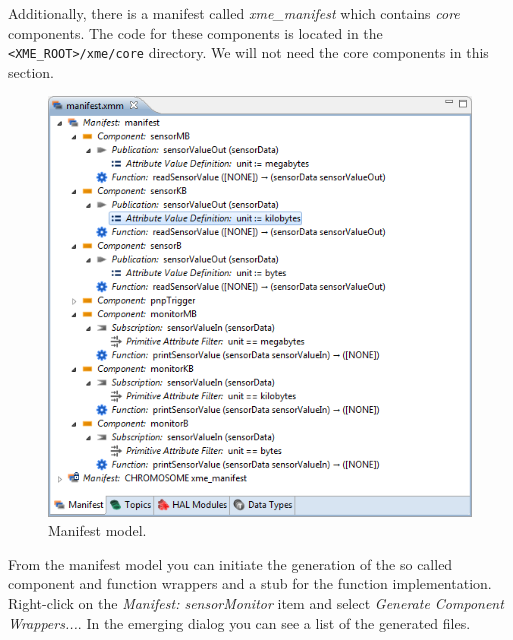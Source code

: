 Additionally, there is a manifest called \xme \emph{xme\_manifest} which contains \emph{core} components. 
The code for these components is located in the \verb|<XME_ROOT>/xme/core| directory.
We will not need the core components in this section.

\begin{figure}[htpb]
	\centering
	\includegraphics[scale=0.6]{figures/xmt_manifest.png}
	\caption{Manifest model.}
	\label{fig:xmt_manifest.png}
\end{figure}

From the manifest model you can initiate the generation of the so called component and function wrappers and a stub for the function implementation.
Right-click on the \emph{Manifest: sensorMonitor} item and select \emph{Generate Component Wrappers...}.
In the emerging dialog you can see a list of the generated files.

